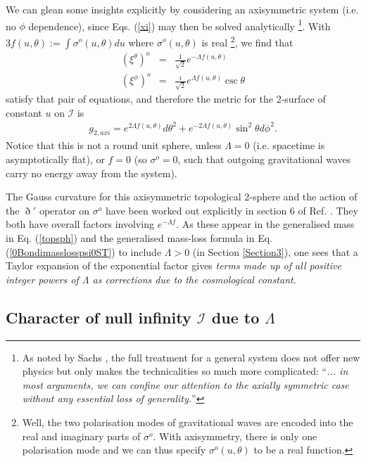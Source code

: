 \documentclass[aps,pre,preprint,superscriptaddress,showpacs,showkeys]{revtex4-1}
\begin{document}
We can glean some insights explicitly by considering an axisymmetric system (i.e. no $\phi$ dependence), since Eqs. (\ref{xi}) may then be solved analytically \footnote{As noted by Sachs \cite{Sachs62}, the full treatment for a general system does not offer new physics but only makes the technicalities so much more complicated: ``\emph{... in most arguments, we can confine our attention to the axially symmetric case without any essential loss of generality.}''}. With $\displaystyle3f(u,\theta):=\int{\sigma^o(u,\theta)du}$ where $\sigma^o(u,\theta)$ is real \footnote{Well, the two polarisation modes of gravitational waves are encoded into the real and imaginary parts of $\sigma^o$. With axisymmetry, there is only one polarisation mode \cite{ash4} and we can thus specify $\sigma^o(u,\theta)$ to be a real function.}, we find that
\begin{eqnarray}
(\xi^\theta)^o&=&\frac{1}{\sqrt{2}}e^{-\Lambda f(u,\theta)}\\
(\xi^\phi)^o&=&\frac{i}{\sqrt{2}}e^{\Lambda f(u,\theta)}\csc{\theta}
\end{eqnarray}
satisfy that pair of equations, and therefore the metric for the 2-surface of constant $u$ on $\mathcal{I}$ is
\begin{eqnarray}\label{2axi}
g_{2,axi}=e^{2\Lambda f(u,\theta)}d\theta^2+e^{-2\Lambda f(u,\theta)}\sin^2{\theta}d\phi^2.
\end{eqnarray}
Notice that this is not a round unit sphere, unless $\Lambda=0$ (i.e. spacetime is asymptotically flat), or $f=0$ (so $\sigma^o=0$, such that outgoing gravitational waves carry no energy away from the system).

The Gauss curvature for this axisymmetric topological 2-sphere and the action of the $\eth'$ operator on $\sigma^o$ have been worked out explicitly in section 6 of Ref. \cite{Vee2016}. They both have overall factors involving $e^{-\Lambda f}$. As these appear in the generalised mass in Eq. (\ref{topsph}) and the generalised mass-loss formula in Eq. (\ref{0Bondimasslosspsi0ST}) to include $\Lambda>0$ (in Section \ref{Section3}), one sees that a Taylor expansion of the exponential factor gives \emph{terms made up of all positive integer powers of $\Lambda$ as corrections due to the cosmological constant}.

\subsection{Character of null infinity $\mathcal{I}$ due to $\Lambda$}\label{Section2D}
\end{document}
